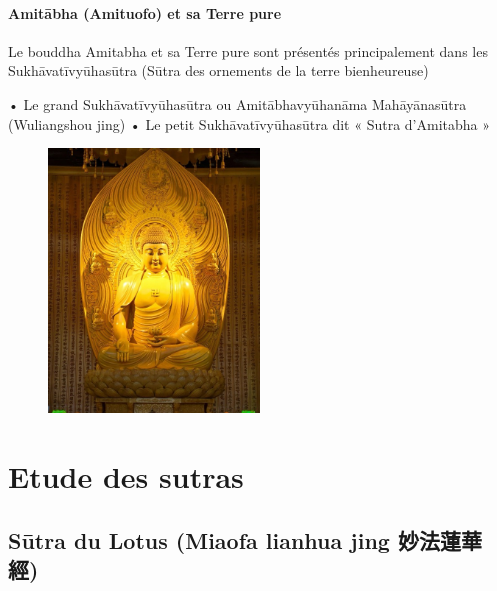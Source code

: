 \paragraph{Amitābha (Amituofo) et sa Terre pure}

Le bouddha Amitabha et sa Terre pure sont présentés principalement dans les Sukhāvatīvyūhasūtra (Sūtra des ornements de la terre bienheureuse)

•	Le grand Sukhāvatīvyūhasūtra ou Amitābhavyūhanāma Mahāyānasūtra (Wuliangshou jing)
•	Le petit Sukhāvatīvyūhasūtra dit « Sutra d’Amitabha »

\begin{figure}
    \centering
    \includegraphics[width=0.5\textwidth]{ConfucianismeTaoismeBouddhismeChinois/Images/BouddhaAmituofo.jpg}

    \label{fig:enter-label}
\end{figure}

\section{Etude des sutras}


\subsection{Sūtra du Lotus (Miaofa lianhua jing 妙法蓮華經)}



